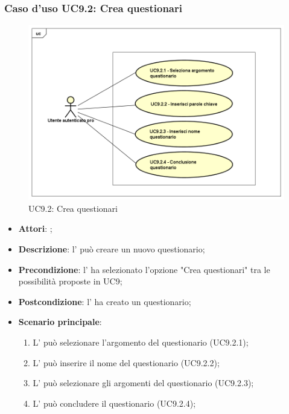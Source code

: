 	\subsubsection{Caso d'uso UC9.2: Crea questionari}
	\label{UC9.2}
	\begin{figure}[h]
		\centering
	\includegraphics[scale=0.5,keepaspectratio]{UML/UC9_2.png}
		\caption{UC9.2: Crea questionari}
	\end{figure}
	\FloatBarrier
	\begin{itemize}
		\item \textbf{Attori}: \uaupro{};
		\item \textbf{Descrizione}: l'\uaupro{} può creare un nuovo questionario; 
		\item \textbf{Precondizione}: l'\uaupro{} ha selezionato l'opzione "Crea questionari" tra le possibilità proposte in UC9;
		\item \textbf{Postcondizione}: l'\uaupro{} ha creato un questionario;
		\item \textbf{Scenario principale}:
			\begin{enumerate}
				\item L'\uaupro{} può selezionare l'argomento del questionario (UC9.2.1);
				\item L'\uaupro{} può inserire il nome del questionario (UC9.2.2);
				\item L'\uaupro{} può selezionare gli argomenti del questionario (UC9.2.3);
				\item L'\uaupro{} può concludere il questionario (UC9.2.4);
			\end{enumerate}
		\end{itemize}
	
